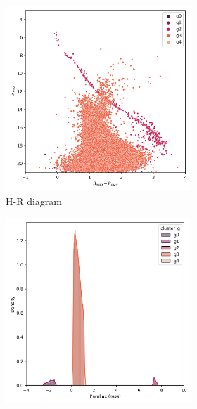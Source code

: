 \documentclass[11pt, a4paper, english]{book}
\begin{document}
\begin{figure}[htbp]
  \centering
  \begin{subfigure}{0.9\textwidth}
    \centering
    \begin{subfigure}[t]{0.45\textwidth}
      \centering
      \includegraphics[width=\textwidth]{../figures/melotte_22/dec_hr_diagram_filtered_melotte_22.png}
      \caption{H-R diagram}
    \end{subfigure}
    \hfill
    \begin{subfigure}[t]{0.45\textwidth}
      \centering
      \includegraphics[width=\textwidth]{../figures/melotte_22/dec_parallax_filtered_melotte_22.png}

\end{subfigure}
\end{subfigure}
\end{figure}
\end{document}
